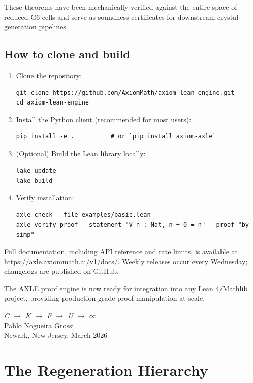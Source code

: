 \documentclass[19pt]{book}
\theoremstyle{plain}
\theoremstyle{definition}
\theoremstyle{remark}
\begin{document}
These theorems have been mechanically verified against the entire space of reduced G6 cells and serve as soundness certificates for downstream crystal-generation pipelines.

\section{How to clone and build}

\begin{enumerate}
\item Clone the repository:
\begin{verbatim}
git clone https://github.com/AxiomMath/axiom-lean-engine.git
cd axiom-lean-engine
\end{verbatim}

\item Install the Python client (recommended for most users):
\begin{verbatim}
pip install -e .          # or `pip install axiom-axle`
\end{verbatim}

\item (Optional) Build the Lean library locally:
\begin{verbatim}
lake update
lake build
\end{verbatim}

\item Verify installation:
\begin{verbatim}
axle check --file examples/basic.lean
axle verify-proof --statement "∀ n : Nat, n + 0 = n" --proof "by simp"
\end{verbatim}
\end{enumerate}

Full documentation, including API reference and rate limits, is available at \url{https://axle.axiommath.ai/v1/docs/}. Weekly releases occur every Wednesday; changelogs are published on GitHub.

The AXLE proof engine is now ready for integration into any Lean 4/Mathlib project, providing production-grade proof manipulation at scale.
\bigskip
\begin{flushright}
\textit{C \;$\to$\; K \;$\to$\; F \;$\to$\; U \;$\to$\; $\infty$}\\[0.3em]
Pablo Nogueira Grossi\\
Newark, New Jersey, March 2026
\end{flushright}
\chapter{The Regeneration Hierarchy}
\end{document}
